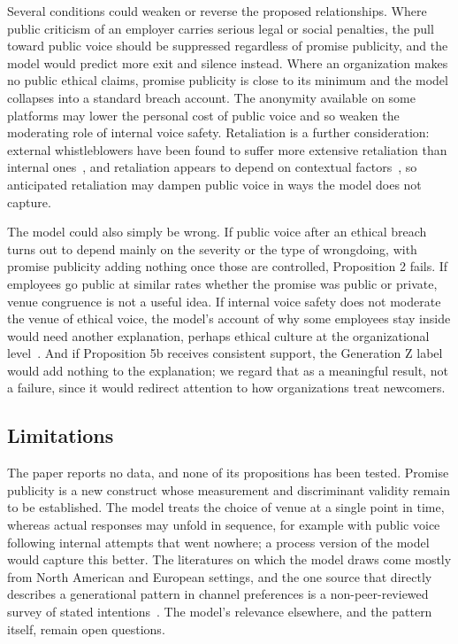 Several conditions could weaken or reverse the proposed relationships. Where public criticism of an employer carries serious legal or social penalties, the pull toward public voice should be suppressed regardless of promise publicity, and the model would predict more exit and silence instead. Where an organization makes no public ethical claims, promise publicity is close to its minimum and the model collapses into a standard breach account. The anonymity available on some platforms may lower the personal cost of public voice and so weaken the moderating role of internal voice safety. Retaliation is a further consideration: external whistleblowers have been found to suffer more extensive retaliation than internal ones~\citep{dworkin1998internal}, and retaliation appears to depend on contextual factors~\citep{mesmermagnus2005whistleblowing}, so anticipated retaliation may dampen public voice in ways the model does not capture.

The model could also simply be wrong. If public voice after an ethical breach turns out to depend mainly on the severity or the type of wrongdoing, with promise publicity adding nothing once those are controlled, Proposition 2 fails. If employees go public at similar rates whether the promise was public or private, venue congruence is not a useful idea. If internal voice safety does not moderate the venue of ethical voice, the model's account of why some employees stay inside would need another explanation, perhaps ethical culture at the organizational level~\citep{kaptein2011inaction}. And if Proposition 5b receives consistent support, the Generation Z label would add nothing to the explanation; we regard that as a meaningful result, not a failure, since it would redirect attention to how organizations treat newcomers.

\subsection{Limitations}

The paper reports no data, and none of its propositions has been tested. Promise publicity is a new construct whose measurement and discriminant validity remain to be established. The model treats the choice of venue at a single point in time, whereas actual responses may unfold in sequence, for example with public voice following internal attempts that went nowhere; a process version of the model would capture this better. The literatures on which the model draws come mostly from North American and European settings, and the one source that directly describes a generational pattern in channel preferences is a non-peer-reviewed survey of stated intentions~\citep{protect2025talkin}. The model's relevance elsewhere, and the pattern itself, remain open questions.
